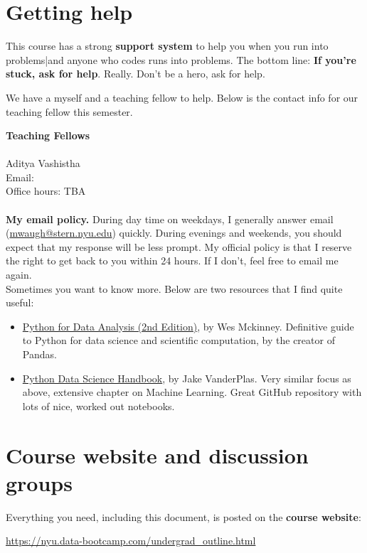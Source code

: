 \section*{Getting help}

This course has a strong {\bf support system\/} to help you when you run into problems|and anyone who codes runs into problems. The bottom line:  {\bf If you're stuck, ask for help\/}.
Really.  Don't be a hero, ask for help.

We have a myself and a teaching fellow to help. Below is the contact info for our teaching fellow this semester.

\textbf{Teaching Fellows}\\
\\
Aditya Vashistha  \\
Email: \\
Office hours: TBA\\
\\
\textbf{My email policy.} During day time on weekdays, I generally answer email (\href{mailto:mwaugh@stern.nyu.edu}{mwaugh@stern.nyu.edu}) quickly. During evenings and weekends, you should expect that my response will be less prompt. My official policy is that I reserve the right to get back to you within 24 hours. If I don't, feel free to email me again.\\

Sometimes you want to know more. Below are two resources that I find quite useful:
\begin{itemize}
\item \href{https://www.amazon.com/Python-Data-Analysis-Wrangling-IPython/dp/1491957662/}{Python for Data Analysis (2nd Edition)}, by Wes Mckinney. Definitive guide to Python for data science and scientific computation, by the creator of Pandas.
\item \href{https://www.amazon.com/Python-Data-Science-Handbook-Essential/dp/1491912057/}{Python Data Science Handbook}, by Jake VanderPlas. Very similar focus as above, extensive chapter on Machine Learning. Great GitHub repository with lots of nice, worked out notebooks.
\end{itemize}


\section*{Course website and discussion groups}

Everything you need, including this document, is posted on
the {\bf course website\/}:
%
\vspace{-0.15in}
\begin{center}
\url{https://nyu.data-bootcamp.com/undergrad_outline.html}
\end{center}
\vspace{-0.15in}

